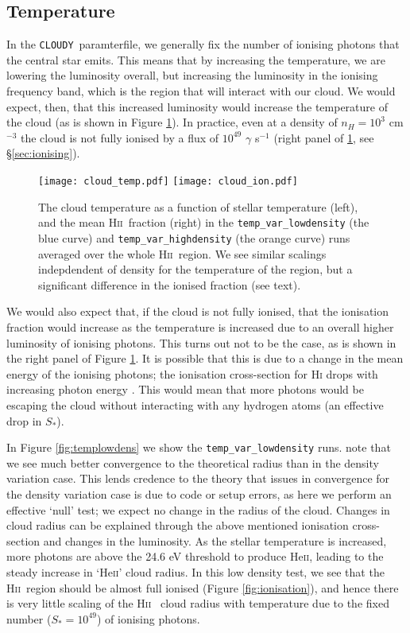 \documentclass[a4paper]{article}
\newcommand{\hii}{H\textsc{ii}~}
\newcommand{\cloudy}{{\tt CLOUDY}~}
\begin{document}
\subsection{Temperature}

In the \cloudy paramterfile, we generally fix the number of ionising photons
that the central star emits. This means that by increasing the temperature,
we are lowering the luminosity overall, but increasing the luminosity in the
ionising frequency band, which is the region that will interact with our
cloud. We would expect, then, that this increased luminosity would increase
the temperature of the cloud (as is shown in Figure \ref{fig:cloudtemp}).
In practice, even at a density of $n_H = 10^{3}$ cm$^{-3}$ the cloud is not
fully ionised by a flux of $10^{49}$ $\gamma$ s$^{-1}$ (right panel of
\ref{fig:cloudtemp}, see §\ref{sec:ionising}).

\begin{figure}[!h]
    \centering
    \texttt{[image: cloud\_temp.pdf]}
    \texttt{[image: cloud\_ion.pdf]}
    \caption{The cloud temperature as a function of stellar temperature (left),
        and the mean \hii fraction (right) in the {\tt temp\_var\_lowdensity}
        (the blue curve) and {\tt temp\_var\_highdensity} (the orange curve)
        runs averaged over the whole \hii region. We see similar scalings
        indepdendent of density for the temperature of the region, but a
        significant difference in the ionised fraction (see text).}
    \label{fig:cloudtemp}
\end{figure}
We would also expect that, if the cloud is not fully ionised, that the
ionisation fraction would increase as the temperature is increased due to an
overall higher luminosity of ionising photons. This turns out not to be the
case, as is shown in the right panel of Figure \ref{fig:cloudtemp}. It is
possible that this is due to a change in the mean energy of the ionising
photons; the ionisation cross-section for H\textsc{i} drops with increasing
photon energy \citep{palenius_absolute_1976}. This would mean that more
photons would be escaping the cloud without interacting with any hydrogen
atoms (an effective drop in $S_*$). 

In Figure \ref{fig:templowdens} we show the {\tt temp\_var\_lowdensity} runs.
note that we see much better convergence to the theoretical
\citet{stromgren_physical_1939} radius than in the density variation case.
This lends credence to the theory that issues in convergence for the density
variation case is due to code or setup errors, as here we perform an effective
`null' test; we expect no change in the radius of the cloud. Changes in cloud
radius can be explained through the above mentioned ionisation cross-section
and changes in the luminosity. As the stellar temperature is increased, more
photons are above the 24.6 eV threshold to produce He\textsc{ii}, leading to
the steady increase in `He\textsc{ii}' cloud radius. In this low density test,
we see that the \hii region should be almost full ionised (Figure
\ref{fig:ionisation}), and hence there is very little scaling of the \hii
cloud radius with temperature due to the fixed number ($S_* = 10^{49}$) of
ionising photons.
\end{document}
